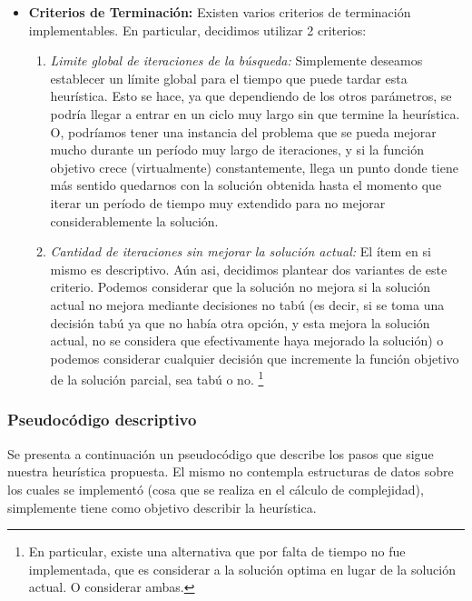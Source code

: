 \begin{itemize}
    \item \textbf{Criterios de Terminaci\'on: } Existen varios criterios
        de terminaci\'on implementables. En particular, decidimos utilizar
        2 criterios:
        \begin{enumerate}
            \item \emph{Limite global de iteraciones de la b\'usqueda: } Simplemente
                deseamos establecer un l\'imite global para el tiempo que puede
                tardar esta heur\'istica. Esto se hace, ya que dependiendo de los
                otros par\'ametros, se podr\'ia llegar a entrar en un ciclo
                muy largo sin que termine la heur\'istica. O, podr\'iamos tener
                una instancia del problema que se pueda mejorar mucho durante
                un per\'iodo muy largo de iteraciones, y si la funci\'on objetivo
                crece (virtualmente) constantemente, llega un punto donde tiene
                m\'as sentido quedarnos con la soluci\'on obtenida hasta el momento
                que iterar un per\'iodo de tiempo muy extendido para no mejorar
                considerablemente la soluci\'on.

            \item \emph{Cantidad de iteraciones sin mejorar la soluci\'on actual: } El
                \'item en si mismo es descriptivo. A\'un asi, decidimos plantear
                dos variantes de este criterio. Podemos considerar que la
                soluci\'on no mejora si la soluci\'on actual no mejora mediante
                decisiones no tab\'u (es decir, si se toma una decisi\'on tab\'u
                ya que no hab\'ia otra opci\'on, y esta mejora la soluci\'on actual,
                no se considera que efectivamente haya mejorado la soluci\'on) o
                podemos considerar cualquier decisi\'on que incremente la
                funci\'on objetivo de la soluci\'on parcial, sea tab\'u o no.%
                \footnote{En particular, existe una alternativa que por falta de
                tiempo no fue implementada, que es considerar a la soluci\'on optima
                en lugar de la soluci\'on actual. O considerar ambas.}
        \end{enumerate}
\end{itemize}

\subsubsection{Pseudoc\'odigo descriptivo}
\par Se presenta a continuaci\'on un pseudoc\'odigo que describe los pasos que sigue
    nuestra heur\'istica propuesta. El mismo no contempla estructuras de datos sobre
    los cuales se implement\'o (cosa que se realiza en el c\'alculo de complejidad),
    simplemente tiene como objetivo describir la heur\'istica.

